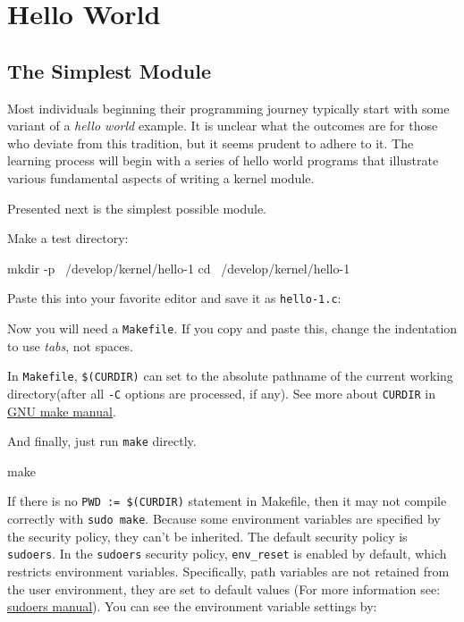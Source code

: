 \documentclass[10pt, oneside]{book}
\begin{document}
\section{Hello World}
\label{sec:helloworld}
\subsection{The Simplest Module}
\label{sec:org2d3e245}
Most individuals beginning their programming journey typically start with some variant of a \emph{hello world} example.
It is unclear what the outcomes are for those who deviate from this tradition, but it seems prudent to adhere to it.
The learning process will begin with a series of hello world programs that illustrate various fundamental aspects of writing a kernel module.

Presented next is the simplest possible module.

Make a test directory:
\begin{codebash}
mkdir -p ~/develop/kernel/hello-1
cd ~/develop/kernel/hello-1
\end{codebash}

Paste this into your favorite editor and save it as \verb|hello-1.c|:


Now you will need a \verb|Makefile|. If you copy and paste this, change the indentation to use \textit{tabs}, not spaces.


In \verb|Makefile|, \verb|$(CURDIR)| can set to the absolute pathname of the current working directory(after all \verb|-C| options are processed, if any). 
See more about \verb|CURDIR| in \href{https://www.gnu.org/software/make/manual/make.html}{GNU make manual}.

And finally, just run \verb|make| directly.

\begin{codebash}
make
\end{codebash}

If there is no \verb|PWD := $(CURDIR)| statement in Makefile, then it may not compile correctly with \verb|sudo make|.
Because some environment variables are specified by the security policy, they can't be inherited.
The default security policy is \verb|sudoers|.
In the \verb|sudoers| security policy, \verb|env_reset| is enabled by default, which restricts environment variables. 
Specifically, path variables are not retained from the user environment, they are set to default values (For more information see: \href{https://www.sudo.ws/docs/man/sudoers.man/}{sudoers manual}).
You can see the environment variable settings by:
\end{document}
